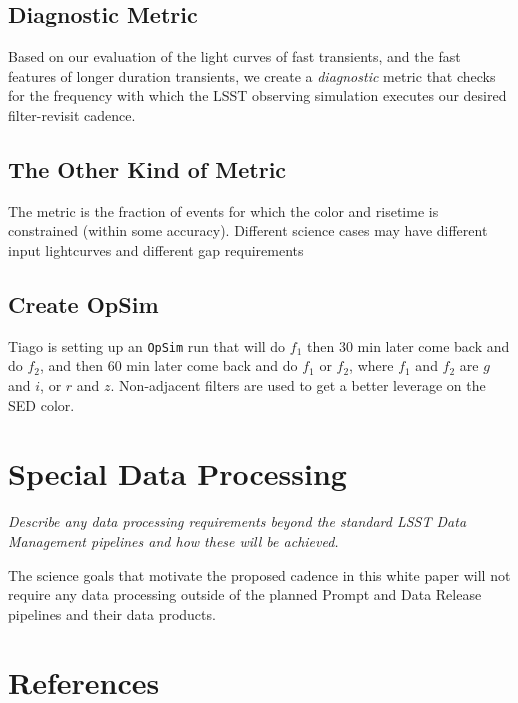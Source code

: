 \documentclass[11pt]{article}
\begin{document}
\subsection{Diagnostic Metric}

Based on our evaluation of the light curves of fast transients, and the fast features of longer duration transients, we create a {\it diagnostic} metric that checks for the frequency with which the LSST observing simulation executes our desired filter-revisit cadence.

\subsection{The Other Kind of Metric}

The metric is the fraction of events for which the color and risetime is constrained (within some accuracy). Different science cases may have different input lightcurves and different gap requirements


\subsection{Create OpSim}

Tiago is setting up an {\tt OpSim} run that will do $f_1$ then 30 min later come back and do $f_2$, and then 60 min later come back and do $f_1$ or $f_2$, where $f_1$ and $f_2$ are $g$ and $i$, or $r$ and $z$. Non-adjacent filters are used to get a better leverage on the SED color.

\vspace{.6in}

\clearpage
\section{Special Data Processing}
\begin{footnotesize}
{\it Describe any data processing requirements beyond the standard LSST Data Management pipelines and how these will be achieved.}
\end{footnotesize}

The science goals that motivate the proposed cadence in this white paper will not require any data processing outside of the planned Prompt and Data Release pipelines and their data products. 

\section{References}


\end{document}
